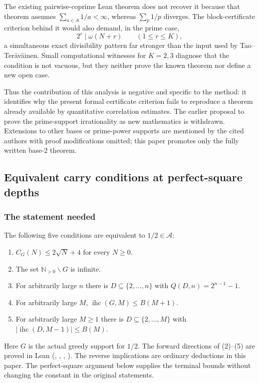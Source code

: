 The existing pairwise-coprime Lean theorem does not recover it because that
theorem assumes $\sum_{a\in A}1/a<\infty$, whereas $\sum_p1/p$ diverges.  The
block-certificate criterion behind it would also demand, in the prime case,
\[
  2^r\mid\omega(N+r)\qquad(1\le r\le K),
\]
a simultaneous exact divisibility pattern far stronger than the input used
by Tao--Ter\"av\"ainen.  Small computational witnesses for $K=2,3$ diagnose
that the condition is not vacuous, but they neither prove the known theorem
nor define a new open case.

Thus the contribution of this analysis is negative and specific to
the method: it identifies why the present formal certificate
criterion fails to reproduce a theorem already available by quantitative
correlation estimates.  The earlier proposal to prove the prime-support
irrationality as new mathematics is withdrawn.  Extensions to other bases
or prime-power supports are mentioned by the cited authors with proof
modifications omitted; this paper promotes only the fully written base-$2$
theorem.

\subsection{Equivalent carry conditions at perfect-square depths}
\label{sec:invent-R4}

\subsubsection*{The statement needed}

The following five conditions are equivalent to $1/2\in\mathcal A$:
\begin{enumerate}[label=(\arabic*)]
\item $C_G(N)\le2\sqrt N+4$ for every $N\ge0$.
\item The set $\mathbb N_{>0}\smallsetminus G$ is infinite.
\item For arbitrarily large $n$ there is
$D\subseteq\{2,\ldots,n\}$ with $Q(D,n)=2^{n-1}-1$.
\item For arbitrarily large $M$,
$\operatorname{ihc}(G,M)\le B(M+1)$.
\item For arbitrarily large $M\ge1$ there is
$D\subseteq\{2,\ldots,M\}$ with
$|\operatorname{ihc}(D,M-1)|\le B(M)$.
\end{enumerate}
Here $G$ is the actual greedy support for $1/2$.
The forward directions of (2)--(5) are proved in Lean
(,
,
,
). The reverse implications are ordinary deductions in
this paper.  The perfect-square argument below supplies the terminal
bounds without changing the constant in the original statements.

